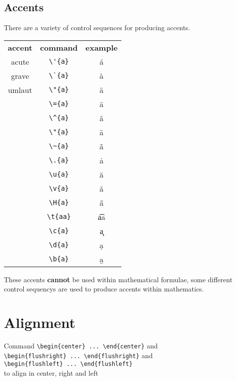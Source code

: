 \subsection{Accents}
There are a variety of control sequences for producing accents.
\begin{table}
    \centering
    \begin{tabular}{ccc}
	{\bf accent}	& {\bf command}	& {\bf example}	\\
	acute	& \verb|\'{a}|	&   \'{a}   \\
	grave	& \verb|\`{a}|	&   \`{a}   \\
	umlaut	& \verb|\"{a}|	&   \"{a}   \\
		& \verb|\={a}|	&   \={a}  \\
		& \verb|\^{a}|	&   \^{a}   \\
		& \verb|\"{a}|	&   \"{a}   \\
		& \verb|\~{a}|	&   \~{a}   \\
		& \verb|\.{a}|	&   \.{a}   \\
		& \verb|\u{a}|	&   \u{a}   \\
		& \verb|\v{a}|	&   \v{a}   \\
		& \verb|\H{a}|	&   \H{a}   \\
		& \verb|\t{aa}|	&   \t{aa}   \\
		& \verb|\c{a}|	&   \c{a}   \\
		& \verb|\d{a}|	&   \d{a}   \\
		& \verb|\b{a}|	&   \b{a}   \\
    \end{tabular}
\end{table}
These accents {\bf cannot} be used within mathematical formulae, some
different control sequencys are used to produce accents within mathematics.

\section{Alignment}
Command \verb|\begin{center} ... \end{center}| and \\
\verb|\begin{flushright} ... \end{flushright}| and \\
\verb|\begin{flushleft} ... \end{flushleft}| \\
to align in center, right and left

